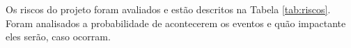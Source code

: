 Os riscos do projeto foram avaliados e estão descritos na Tabela \ref{tab:riscos}. Foram analisados a probabilidade de acontecerem os eventos e quão impactante eles serão, caso ocorram.


